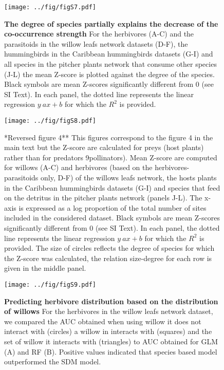 \newpage

\begin{figure}[htbp]
\centering
\texttt{[image: ../fig/figS7.pdf]}
\caption{\textbf{The degree of species partially explains the decrease
of the co-occurrence strength} For the herbivores (A-C) and the
parasitoids in the willow leafs network datasets (D-F), the hummingbirds
in the Caribbean hummingbirds datasets (G-I) and all species in the
pitcher plants network that consume other species (J-L) the mean Z-score
is plotted against the degree of the species. Black symbols are mean
Z-scores significantly different from 0 (see SI Text). In each panel,
the dotted line represents the linear regression \(y~ax+b\) for which
the \(R^2\) is provided.\label{fig:degree}}
\end{figure}

\newpage

\begin{figure}[htbp]
\centering
\texttt{[image: ../fig/figS8.pdf]}
\caption{*Reversed figure 4** This figures correspond to the figure 4 in
the main text but the Z-score are calculated for preys (host plants)
rather than for predators 9pollinators). Mean Z-score are computed for
willows (A-C) and herbivores (based on the herbivores-parasitoids only,
D-F) of the willows leafs network, the hosts plants in the Caribbean
hummingbirds datasets (G-I) and species that feed on the detritus in the
pitcher plants network (panels J-L). The x-axis is expressed as a log
proportion of the total number of sites included in the considered
dataset. Black symbols are mean Z-scores significantly different from 0
(see SI Text). In each panel, the dotted line represents the linear
regression \(y~ax+b\) for which the \(R^2\) is provided. The size of
circles reflects the degree of species for which the Z-score was
calculated, the relation size-degree for each row is given in the middle
panel.\label{fig:degocc2}}
\end{figure}

\newpage

\begin{figure}[htbp]
\centering
\texttt{[image: ../fig/figS9.pdf]}
\caption{\textbf{Predicting herbivore distribution based on the
distribution of willows} For the herbivores in the willow leafs network
dataset, we compared the AUC obtained when using willow it does not
interact with (circles) a willow in interacts with (squares) and the set
of willow it interacts with (triangles) to AUC obtained for GLM (A) and
RF (B). Positive values indicated that species based model outperformed
the SDM model.\label{fig:ratauc}}
\end{figure}

